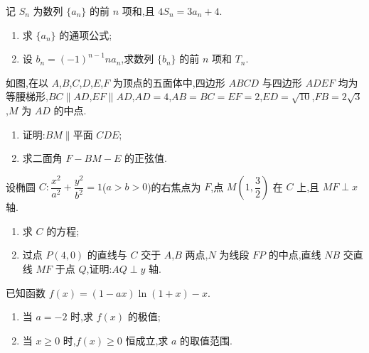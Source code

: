 \begin{problem}
记 \( S_n \) 为数列 \( \{a_n\} \) 的前 \( n \) 项和,且 \( 4S_n=3a_n+4 \).

\begin{enumerate}
\item 求 \( \{a_n\} \) 的通项公式;
\item 设 \( b_n=\left( -1 \right)^{n-1}na_n \),求数列 \( \{b_n\} \) 的前 \( n \) 项和 \( T_n \).
\end{enumerate}
\end{problem}

\begin{problem}
如图,在以 \(A\),\(B\),\(C\),\(D\),\(E\),\(F\) 为顶点的五面体中,四边形 \(ABCD\) 与四边形 \(ADEF\) 均为等腰梯形,\( BC\parallel AD \),\( EF\parallel AD \),\( AD=4 \),\( AB=BC=EF=2 \),\( ED=\sqrt{10} \),\( FB=2\sqrt{3} \),\(M\) 为 \(AD\) 的中点.

\begin{enumerate}
\item 证明:\( BM\parallel \)平面 \(CDE\);
\item 求二面角 \( F-BM-E \) 的正弦值.
\end{enumerate}

\end{problem}

\begin{problem}
设椭圆 \( C:\dfrac{x^2}{a^2}+\dfrac{y^2}{b^2}=1 \)(\( a>b>0 \))的右焦点为 \(F\),点 \( M\left( 1,\dfrac{3}{2} \right) \) 在 \(C\) 上,且 \( MF\perp x \) 轴.

\begin{enumerate}
\item 求 \(C\) 的方程;
\item 过点 \( P(4,0) \) 的直线与 \(C\) 交于 \(A\),\(B\) 两点,\(N\) 为线段 \(FP\) 的中点,直线 \(NB\) 交直线 \(MF\) 于点 \(Q\),证明:\( AQ\perp y \) 轴.
\end{enumerate}
\end{problem}

\begin{problem}
已知函数 \( f(x)=(1-ax)\ln(1+x)-x \).

\begin{enumerate}
\item 当 \( a=-2 \) 时,求 \( f(x) \) 的极值;
\item 当 \( x\ge 0 \) 时,\( f(x)\ge 0 \) 恒成立,求 \( a \) 的取值范围.
\end{enumerate}
\end{problem}

